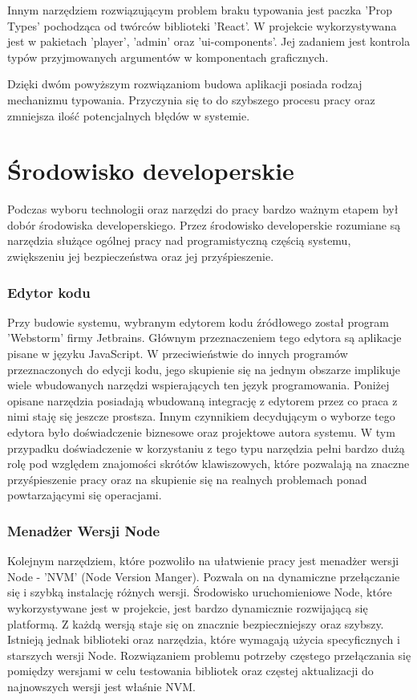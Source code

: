 Innym narzędziem rozwiązującym problem braku typowania jest paczka 'Prop Types' pochodząca od twórców biblioteki 'React'. W projekcie wykorzystywana jest w pakietach 'player', 'admin' oraz 'ui-components'. Jej zadaniem jest kontrola typów przyjmowanych argumentów w komponentach graficznych.

Dzięki dwóm powyższym rozwiązaniom budowa aplikacji posiada rodzaj mechanizmu typowania. Przyczynia się to do szybszego procesu pracy oraz zmniejsza ilość potencjalnych błędów w systemie.

\section{Środowisko developerskie}
Podczas wyboru technologii oraz narzędzi do pracy bardzo ważnym etapem był dobór środowiska developerskiego. Przez środowisko developerskie rozumiane są narzędzia służące ogólnej pracy nad programistyczną częścią systemu, zwiększeniu jej bezpieczeństwa oraz jej przyśpieszenie.

\subsubsection{Edytor kodu}
Przy budowie systemu, wybranym edytorem kodu źródłowego został program 'Webstorm' firmy Jetbrains. Głównym przeznaczeniem tego edytora są aplikacje pisane w języku JavaScript. W przeciwieństwie do innych programów przeznaczonych do edycji kodu, jego skupienie się na jednym obszarze implikuje wiele wbudowanych narzędzi wspierających ten język programowania. Poniżej opisane narzędzia posiadają wbudowaną integrację z edytorem przez co praca z nimi staję się jeszcze prostsza. Innym czynnikiem decydującym o wyborze tego edytora było doświadczenie biznesowe oraz projektowe autora systemu. W tym przypadku doświadczenie w korzystaniu z tego typu narzędzia pełni bardzo dużą rolę pod względem znajomości skrótów klawiszowych, które pozwalają na znaczne przyśpieszenie pracy oraz na skupienie się na realnych problemach ponad powtarzającymi się operacjami.


\subsubsection{Menadżer Wersji Node}
Kolejnym narzędziem, które pozwoliło na ułatwienie pracy jest menadżer wersji Node - 'NVM' (Node Version Manger).
Pozwala on na dynamiczne przełączanie się i szybką instalację różnych wersji. Środowisko uruchomieniowe Node, które wykorzystywane jest w projekcie, jest bardzo dynamicznie rozwijającą się platformą. Z każdą wersją staje się on znacznie bezpieczniejszy oraz szybszy. Istnieją jednak biblioteki oraz narzędzia, które wymagają użycia specyficznych \newline i starszych wersji Node. Rozwiązaniem problemu potrzeby częstego przełączania się pomiędzy wersjami w celu testowania bibliotek oraz częstej aktualizacji do najnowszych wersji jest właśnie NVM. \cite{NVMDocs}


